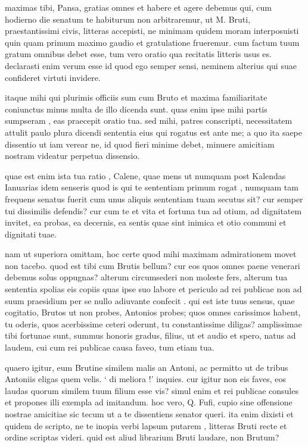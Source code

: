 
 maximas tibi, Pansa, gratias omnes et habere et agere debemus qui, cum hodierno die senatum te habiturum non arbitraremur, ut M. Bruti, praestantissimi civis, litteras accepisti, ne minimam quidem moram interposuisti quin quam primum maximo gaudio et gratulatione frueremur. cum factum tuum gratum omnibus debet esse, tum vero oratio qua recitatis litteris usus es. declarasti enim verum esse id quod ego semper sensi, neminem alterius qui suae confideret virtuti invidere.

 itaque mihi qui plurimis officiis sum cum Bruto et maxima familiaritate coniunctus minus multa de illo dicenda sunt. quas enim ipse mihi partis sumpseram , eas praecepit oratio tua. sed mihi, patres conscripti, necessitatem attulit paulo plura dicendi sententia eius qui rogatus est ante me; a quo ita saepe dissentio ut iam verear ne, id quod fieri minime debet, minuere amicitiam nostram videatur perpetua dissensio.

 quae est enim ista tua ratio , Calene, quae mens ut numquam post Kalendas Ianuarias idem senseris quod is qui te sententiam primum rogat , numquam tam frequens senatus fuerit cum unus aliquis sententiam tuam secutus sit? cur semper tui dissimilis defendis? cur cum te et vita et fortuna tua ad otium, ad dignitatem invitet, ea probas, ea decernis, ea sentis quae sint inimica et otio communi et dignitati tuae.

 nam ut superiora omittam, hoc certe quod mihi maximam admirationem movet non tacebo. quod est tibi cum Brutis bellum? cur eos quos omnes paene venerari debemus solus oppugnas? alterum circumsederi non moleste fers, alterum tua sententia spolias eis copiis quas ipse suo labore et periculo ad rei publicae non ad suum praesidium per se nullo adiuvante confecit . qui est iste tuus sensus, quae cogitatio, Brutos ut non probes, Antonios probes; quos omnes carissimos habent, tu oderis, quos acerbissime ceteri oderunt, tu constantissime diligas? amplissimae tibi fortunae sunt, summus honoris gradus, filius, ut et audio et spero, natus ad laudem, cui cum rei publicae causa faveo, tum etiam tua.

 quaero igitur, eum Brutine similem malis an Antoni, ac permitto ut de tribus Antoniis eligas quem velis. ` di meliora !' inquies. cur igitur non eis faves, eos laudas quorum similem tuum filium esse vis? simul enim et rei publicae consules et propones illi exempla ad imitandum. hoc vero, Q. Fufi, cupio sine offensione nostrae amicitiae sic tecum ut a te dissentiens senator queri. ita enim dixisti et quidem de scripto, ne te inopia verbi lapsum putarem , litteras Bruti recte et ordine scriptas videri. quid est aliud librarium Bruti laudare, non Brutum?

